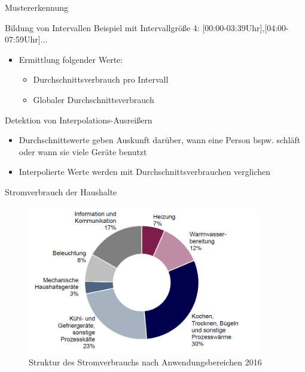 \begin{frame}{Mustererkennung}
\begin{block}{Bildung von Intervallen}
\smallskip
\small{Beispiel mit Intervallgröße 4: [00:00-03:39Uhr],[04:00-07:59Uhr]...}\normalsize
\smallskip
\begin{itemize}
\item Ermittlung folgender Werte:
\begin{itemize}
\item Durchschnittsverbrauch pro Intervall
\item Globaler Durchschnittsverbrauch
\end{itemize}
\end{itemize}
\end{block}
\begin{block}{Detektion von Interpolations-Ausreißern}
\begin{itemize}
\item Durchschnittswerte geben Auskunft darüber, wann eine Person bspw. schläft oder wann sie viele Geräte benutzt
\item Interpolierte Werte werden mit Durchschnittsverbrauchen verglichen
\end{itemize}
\end{block}

\end{frame}


\begin{frame}{Stromverbrauch der Haushalte}
\begin{figure}
  \centering
     \includegraphics[width=0.9\textwidth]{pics/avgEnergyConsumption.png}
  	\caption{Struktur des Stromverbrauchs nach Anwendungsbereichen 2016 \cite{bdew:consumption}}
  \label{fig:Bild1}
\end{figure}
\end{frame}

